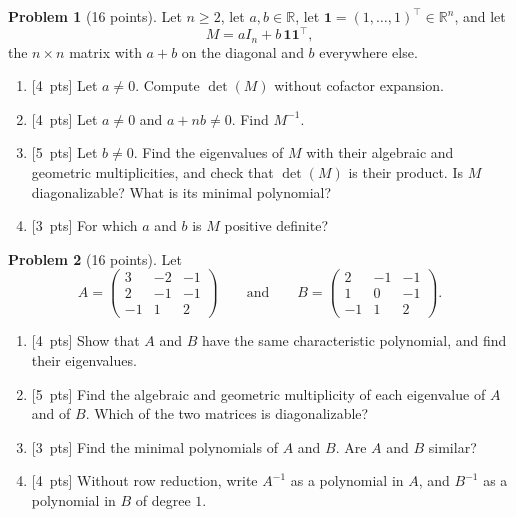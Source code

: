 \documentclass[11pt]{article}
\theoremstyle{definition}
\newtheorem{problem}{Problem}
\newcommand{\pts}[1]{\textup{[#1~pts]}}
\begin{document}
\begin{problem}[16 points]\label{pr:mid-low-rank}
    Let $n \geq 2$, let $a, b \in \mathbb{R}$, let $\mathbf{1} = (1, \ldots, 1)^\top \in \mathbb{R}^n$, and let
    \[M = aI_n + b\,\mathbf{1}\mathbf{1}^\top,\]
    the $n \times n$ matrix with $a + b$ on the diagonal and $b$ everywhere else.
    \begin{enumerate}[label=(\alph*)]
        \item \pts{4} Let $a \neq 0$. Compute $\det(M)$ without cofactor expansion.
        \item \pts{4} Let $a \neq 0$ and $a + nb \neq 0$. Find $M^{-1}$.
        \item \pts{5} Let $b \neq 0$. Find the eigenvalues of $M$ with their algebraic and geometric multiplicities, and check that $\det(M)$ is their product. Is $M$ diagonalizable? What is its minimal polynomial?
        \item \pts{3} For which $a$ and $b$ is $M$ positive definite?
    \end{enumerate}
\end{problem}

\begin{problem}[16 points]\label{pr:mid-eigen}
    Let
    \[A = \begin{pmatrix} 3 & -2 & -1 \\ 2 & -1 & -1 \\ -1 & 1 & 2 \end{pmatrix} \qquad \text{and} \qquad B = \begin{pmatrix} 2 & -1 & -1 \\ 1 & 0 & -1 \\ -1 & 1 & 2 \end{pmatrix}.\]
    \begin{enumerate}[label=(\alph*)]
        \item \pts{4} Show that $A$ and $B$ have the same characteristic polynomial, and find their eigenvalues.
        \item \pts{5} Find the algebraic and geometric multiplicity of each eigenvalue of $A$ and of $B$. Which of the two matrices is diagonalizable?
        \item \pts{3} Find the minimal polynomials of $A$ and $B$. Are $A$ and $B$ similar?
        \item \pts{4} Without row reduction, write $A^{-1}$ as a polynomial in $A$, and $B^{-1}$ as a polynomial in $B$ of degree $1$.
    \end{enumerate}
\end{problem}
\end{document}
